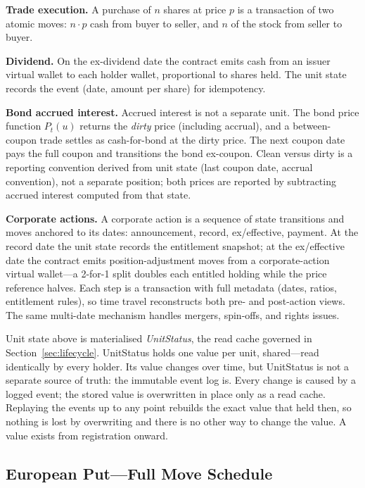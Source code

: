 \noindent\textbf{Trade execution.} A purchase of $n$ shares at price $p$ is a transaction of two atomic moves: $n \cdot p$ cash from buyer to seller, and $n$ of the stock from seller to buyer.

\noindent\textbf{Dividend.} On the ex-dividend date the contract emits cash from an issuer virtual wallet to each holder wallet, proportional to shares held. The unit state records the event (date, amount per share) for idempotency.

\noindent\textbf{Bond accrued interest.} Accrued interest is not a separate unit. The bond price function $P_t(u)$ returns the \emph{dirty} price (including accrual), and a between-coupon trade settles as cash-for-bond at the dirty price. The next coupon date pays the full coupon and transitions the bond ex-coupon. Clean versus dirty is a reporting convention derived from unit state (last coupon date, accrual convention), not a separate position; both prices are reported by subtracting accrued interest computed from that state.

\noindent\textbf{Corporate actions.} A corporate action is a sequence of state transitions and moves anchored to its dates: announcement, record, ex/effective, payment. At the record date the unit state records the entitlement snapshot; at the ex/effective date the contract emits position-adjustment moves from a corporate-action virtual wallet---a 2-for-1 split doubles each entitled holding while the price reference halves. Each step is a transaction with full metadata (dates, ratios, entitlement rules), so time travel reconstructs both pre- and post-action views. The same multi-date mechanism handles mergers, spin-offs, and rights issues.

\begin{remark}
Unit state above is materialised \emph{UnitStatus}, the read cache governed in Section~\ref{sec:lifecycle}. UnitStatus holds one value per unit, shared---read identically by every holder. Its value changes over time, but UnitStatus is not a separate source of truth: the immutable event log is. Every change is caused by a logged event; the stored value is overwritten in place only as a read cache. Replaying the events up to any point rebuilds the exact value that held then, so nothing is lost by overwriting and there is no other way to change the value. A value exists from registration onward.
\end{remark}

\subsection{European Put---Full Move Schedule}

